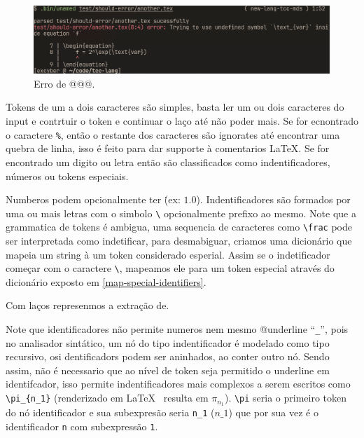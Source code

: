 \begin{figure}[H]
    \caption{\label{error-undefined-symbol} \small Erro de @@@.}
    \begin{center}
        \includegraphics[scale=0.5]{./Imagens/error-undefined-symbol.png}
    \end{center}
\end{figure}

Tokens de um a dois caracteres são simples, basta ler um ou dois caracteres do input e contrtuir o token e continuar o laço até não poder mais. Se for ecnontrado o caractere \texttt{\%}, então o restante dos caracteres são ignorates até encontrar uma quebra de linha, isso é feito para dar supporte à comentarios \LaTeX{}.
Se for encontrado um digito ou letra então são classificados como indentificadores, números ou tokens especiais.

Numberos podem opcionalmente ter \. (ex: $1.0$). Indentificadores são formados por uma ou mais letras com o simbolo \verb"\" opcionalmente prefixo ao mesmo. Note que a grammatica de tokens é ambigua, uma sequencia de caracteres como \verb"\frac" pode ser interpretada como indetificar, para desmabiguar, criamos uma dicionário que mapeia um string à um token considerado esperial. Assim se o indetificador começar com o caractere \verb"\", mapeamos ele para um token especial através do dicionário exposto em \autoref{map-special-identifiers}.

Com laços represenmos a extração de.

\label{lexer-subexpression}
Note que identificadores não permite numeros nem mesmo @underline ``\verb|_|'', pois  no analisador sintático, um nó do tipo indentificador é modelado como tipo recursivo, osi dentificadors podem ser aninhados, ao  conter outro nó. Sendo assim, não é necessario que ao nível de token seja permitido o underline em identifcador, isso permite indentificadores mais complexos a serem escritos como \verb|\pi_{n_1}| (renderizado em \LaTeX{} \ resulta em $\pi_{n_1}$). \verb"\pi"  seria o primeiro token do nó identificador e sua subexpresão seria \verb"n_1" ($n\_1$) que por sua vez é o identificador \verb"n" com subexpressão \verb"1".


